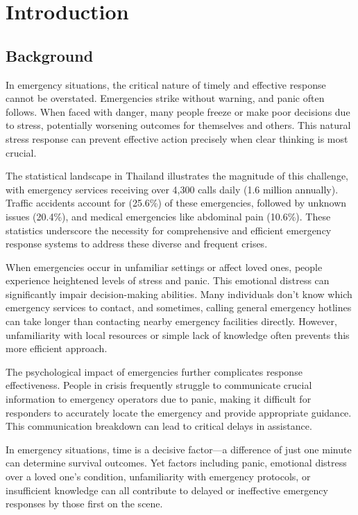 \chapter{Introduction}
\label{chap:introduction}

\section{Background}
\label{section:background}

In emergency situations, the critical nature of timely and effective response cannot be overstated. Emergencies strike without warning, and panic often follows. When faced with danger, many people freeze or make poor decisions due to stress, potentially worsening outcomes for themselves and others. This natural stress response can prevent effective action precisely when clear thinking is most crucial.

The statistical landscape in Thailand illustrates the magnitude of this challenge, with emergency services receiving over 4,300 calls daily (1.6 million annually). Traffic accidents account for (25.6\%) of these emergencies, followed by unknown issues (20.4\%), and medical emergencies like abdominal pain (10.6\%). These statistics underscore the necessity for comprehensive and efficient emergency response systems to address these diverse and frequent crises.

When emergencies occur in unfamiliar settings or affect loved ones, people experience heightened levels of stress and panic. This emotional distress can significantly impair decision-making abilities. Many individuals don't know which emergency services to contact, and sometimes, calling general emergency hotlines can take longer than contacting nearby emergency facilities directly. However, unfamiliarity with local resources or simple lack of knowledge often prevents this more efficient approach.

The psychological impact of emergencies further complicates response effectiveness. People in crisis frequently struggle to communicate crucial information to emergency operators due to panic, making it difficult for responders to accurately locate the emergency and provide appropriate guidance. This communication breakdown can lead to critical delays in assistance.

In emergency situations, time is a decisive factor—a difference of just one minute can determine survival outcomes. Yet factors including panic, emotional distress over a loved one's condition, unfamiliarity with emergency protocols, or insufficient knowledge can all contribute to delayed or ineffective emergency responses by those first on the scene.

